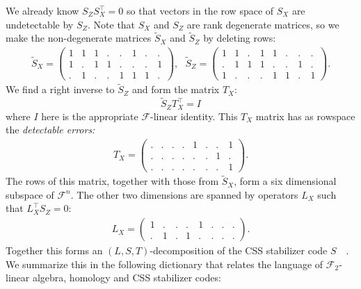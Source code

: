 \documentclass[11pt,oneside]{report}
\newcommand{\danbrowne}[1]{\ \textcolor{red}{\{#1\}}\ }
\newcommand{\Field}{\mathcal{F}}
\begin{document}
We already know $S_ZS_X^\top=0$ so that vectors in the row space 
of $S_X$ are undetectable by $S_Z.$
Note that $S_X$ and $S_Z$ are rank degenerate matrices, so
we make the non-degenerate matrices $\tilde{S}_X$ and $\tilde{S}_Z$ 
by deleting rows:
\begin{align*}
\tilde{S}_X = \left( \begin{array}{cccccccc}
1&1&1&.&.&1&.&.\\
1&.&1&1&.&.&.&1\\
.&1&.&.&1&1&1&.
\end{array} \right),\ \ \ 
\tilde{S}_Z = \left( \begin{array}{cccccccc}
1&1&.&1&1&.&.&.\\
.&1&1&1&.&.&1&.\\
1&.&.&.&1&1&.&1
\end{array} \right).
\end{align*}
We find a right inverse to $\tilde{S}_Z$ and form the matrix $T_X$:
$$
    \tilde{S}_Z T_X^\top = I
$$
where $I$ here is the appropriate $\Field$-linear identity.
This $T_X$ matrix has as rowspace the \emph{detectable errors:}
\begin{align*}
T_X = \left( \begin{array}{cccccccc}
.&.&.&.&1&.&.&1\\
.&.&.&.&.&.&1&.\\
.&.&.&.&.&.&.&1
\end{array} \right).
\end{align*}
The rows of this matrix,
together with those from $\tilde{S}_X$, form a six dimensional
subspace of $\Field^n$.
The other two dimensions are
spanned by operators $L_X$ such that $L_X^\top S_Z=0:$ 
\begin{align*}
L_X = \left( \begin{array}{cccccccc}
1&.&.&.&1&.&.&.\\
.&1&.&1&.&.&.&.
\end{array} \right).
\end{align*}
Together this forms an $(L,S,T)$-decomposition of the CSS
stabilizer code $S$\ \ \cite{Duclos-Cianci2010a,Yoshida2010}.
We summarize this in the following dictionary that
relates the language of $\Field_2$-linear algebra, homology and
CSS stabilizer codes:
\end{document}
